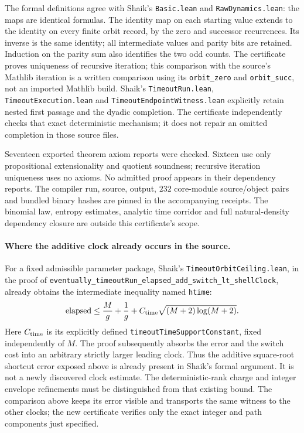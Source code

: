 The formal definitions agree with Shaik's \texttt{Basic.lean} and
\texttt{RawDynamics.lean}: the maps are identical formulas.
The identity map on each starting value extends to the identity
on every finite orbit record, by the zero and successor recurrences.
Its inverse is the same identity; all intermediate values and parity
bits are retained. Induction on the parity sum also identifies the
two odd counts. The certificate proves uniqueness of recursive
iteration; this comparison with the source's Mathlib iteration is
a written comparison using its \texttt{orbit\_zero} and
\texttt{orbit\_succ}, not an imported Mathlib build.
Shaik's \texttt{TimeoutRun.lean}, \texttt{TimeoutExecution.lean} and
\texttt{TimeoutEndpointWitness.lean} explicitly retain nested first
passage and the dyadic completion. The certificate independently
checks that exact deterministic mechanism; it does not repair an
omitted completion in those source files.

Seventeen exported theorem axiom reports were checked. Sixteen use
only propositional extensionality and quotient soundness; recursive
iteration uniqueness uses no axioms. No admitted proof appears in
their dependency reports. The compiler run, source, output, \(232\)
core-module source/object pairs and bundled binary hashes are pinned
in the accompanying receipts. The binomial law, entropy estimates,
analytic time corridor and full natural-density dependency closure
are outside this certificate's scope.

\paragraph{Where the additive clock already occurs in the source.}
For a fixed admissible parameter package, Shaik's
\texttt{TimeoutOrbitCeiling.lean}, in the proof of
\texttt{eventually\_timeoutRun\_elapsed\_add\_switch\_lt\_shellClock},
already obtains the intermediate inequality named \texttt{htime}:
\[
 \mathrm{elapsed}\le
 \frac{M}{g}+\frac1g+
 C_{\rm time}\sqrt{(M+2)\log(M+2)}.
\]
Here \(C_{\rm time}\) is its explicitly defined
\texttt{timeoutTimeSupportConstant}, fixed independently of \(M\).
The proof subsequently absorbs the error and the switch cost into
an arbitrary strictly larger leading clock. Thus the additive
square-root shortcut error exposed above is already present in
Shaik's formal argument. It is not a newly discovered clock estimate.
The deterministic-rank charge and integer envelope refinements must
be distinguished from that existing bound. The comparison above
keeps its error visible and transports the same witness to the
other clocks; the new certificate verifies only the exact integer
and path components just specified.

